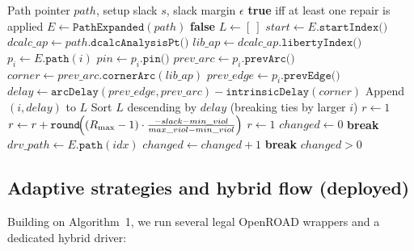 \documentclass[conference]{IEEEtran}
\begin{document}
\begin{algorithm}
\caption{Repair Setup Path Pseudo Code (From OpenROAD\cite{OpenROAD})}
\label{alg:repair-setup}
\begin{algorithmic}[1]
  \Require Path pointer $path$, setup slack $s$, slack margin $\epsilon$
  \Ensure \textbf{true} iff at least one repair is applied
  \State $E \gets \texttt{PathExpanded}(path)$ 
      \State \Return \textbf{false} 
  \EndIf
  \State $L \gets [~]$ 
  \State $start \gets E.\texttt{startIndex()}$
  \State $dcalc\_ap \gets path.\texttt{dcalcAnalysisPt()}$
  \State $lib\_ap \gets dcalc\_ap.\texttt{libertyIndex()}$
   
      \State $p_i \gets E.\texttt{path}(i)$
      \State $pin \gets p_i.\texttt{pin()}$
          \State $prev\_arc  \gets p_i.\texttt{prevArc()}$
          \State $corner    \gets prev\_arc.\texttt{cornerArc}(lib\_ap)$
          \State $prev\_edge \gets p_i.\texttt{prevEdge()}$
          \State $delay     \gets \texttt{arcDelay}(prev\_edge,prev\_arc)
                             - \texttt{intrinsicDelay}(corner)$
          \State Append $(i,delay)$ to $L$
      \EndIf
  \EndFor
  \State Sort $L$ descending by $delay$ (breaking ties by larger $i$)
  \State $r \gets 1$ 
      \State $r \gets r + \texttt{round}\!\Bigl((R_{\max}-1)
             \cdot \frac{-slack - min\_viol}{max\_viol - min\_viol}\Bigr)$
  \EndIf
   
      \State $r \gets 1$
  \EndIf
  \State $changed \gets 0$
          \State \textbf{break}
      \EndIf
      \State $drv\_path \gets E.\texttt{path}(idx)$
                \State $changed \gets changed + 1$
                \State \textbf{break}  
          \EndIf
      \EndFor
  \EndFor
  \State \Return $changed > 0$
\end{algorithmic}
\end{algorithm}

\subsection{Adaptive strategies and hybrid flow (deployed)}
Building on Algorithm~1, we run several legal OpenROAD wrappers and a dedicated hybrid driver:
\end{document}
